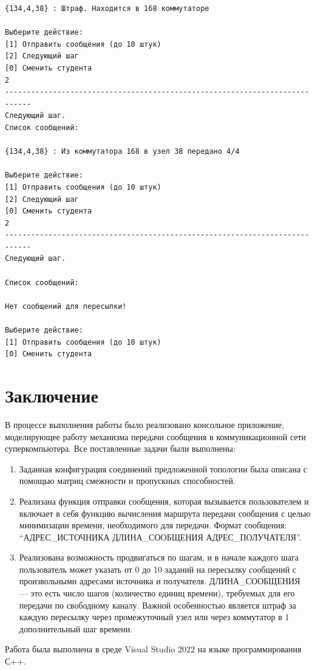 \documentclass[11pt,a4paper,final]{article} %
\begin{document}
\begin{lstlisting}[label=lst6]
{134,4,38} : Штраф. Находится в 168 коммутаторе

Выберите действие:
[1] Отправить сообщения (до 10 штук)
[2] Следующий шаг
[0] Сменить студента
2
----------------------------------------------------------------------------
Следующий шаг.
Список сообщений:

{134,4,38} : Из коммутатора 168 в узел 38 передано 4/4

Выберите действие:
[1] Отправить сообщения (до 10 штук)
[2] Следующий шаг
[0] Сменить студента
2
----------------------------------------------------------------------------
Следующий шаг.

Список сообщений:

Нет сообщений для пересылки!

Выберите действие:
[1] Отправить сообщения (до 10 штук)
[0] Сменить студента
\end{lstlisting}

\newpage
\section*{Заключение}

В процессе выполнения работы было реализовано консольное приложение, моделирующее работу механизма передачи сообщения в коммуникационной сети суперкомпьютера. Все поставленные задачи были выполнены: 
\begin{enumerate}
	\item Заданная конфигурация соединений предложенной топологии была описана с помощью матриц смежности и пропускных способностей. 
	\item Реализана функция отправки сообщения, которая вызывается пользователем и включает в себя функцию вычисления маршрута передачи сообщения с целью минимизации времени, необходимого для передачи. Формат сообщения: ``АДРЕС\_ИСТОЧНИКА ДЛИНА\_СООБЩЕНИЯ АДРЕС\_ПОЛУЧАТЕЛЯ''.
	\item Реализована возможность продвигаться по шагам, и в начале каждого шага пользователь может указать от 0 до 10 заданий на пересылку сообщений с произвольными адресами источника и получателя. ДЛИНА\_СООБЩЕНИЯ — это есть число шагов (количество единиц времени), требуемых для его передачи по свободному каналу.
	Важной особенностью является штраф за каждую пересылку через промежуточный узел или через коммутатор в 1 дополнительный шаг времени.
\end{enumerate}

\par Работа была выполнена в среде Visual Studio 2022 на языке программирования С++.	
\end{document}
